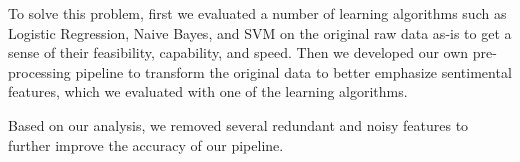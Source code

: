 To solve this problem\cite{Qu:2010:BMR:1873781.1873884,li2010}, first
we evaluated a number of learning algorithms such as Logistic Regression,
Naive Bayes, and SVM on the original raw data as-is to get a sense
of their feasibility, capability, and speed. Then we developed our
own pre-processing pipeline to transform the original data to better
emphasize sentimental features, which we evaluated with one of the
learning algorithms. 

Based on our analysis, we removed several redundant and noisy features
to further improve the accuracy of our pipeline.
